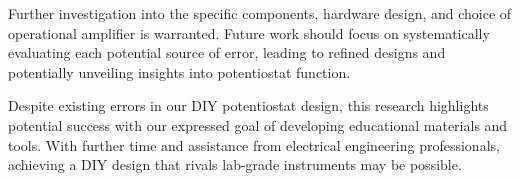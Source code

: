 \documentclass{article}
\begin{document}
Further investigation into the specific components, hardware design, and choice of operational amplifier is warranted. Future work should focus on systematically evaluating each potential source of error, leading to refined designs and potentially unveiling insights into potentiostat function.



Despite existing errors in our DIY potentiostat design, this research highlights potential success with our expressed goal of developing educational materials and tools. With further time and assistance from electrical engineering professionals, achieving a DIY design that rivals lab-grade instruments may be possible.
\end{document}
